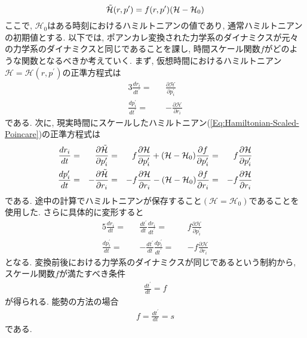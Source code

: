 \begin{equation}
  \Tilde{\mathcal{H}}(r, p^{\prime})
  =
  f(r, p^{\prime}) (\mathcal{H} - \mathcal{H}_{0})
  \label{Eq:Hamiltonian-Scaled-Poincare}
\end{equation}
ここで, $\mathcal{H}_{0}$はある時刻におけるハミルトニアンの値であり, 通常ハミルトニアンの初期値とする. 以下では, ポアンカレ変換された力学系のダイナミクスが元々の力学系のダイナミクスと同じであることを課し, 時間スケール関数$f$がどのような関数となるべきか考えていく. 
まず, 仮想時間におけるハミルトニアン$\mathcal{H} = \mathcal{H}(r, p^{\prime})$の正準方程式は
\begin{alignat}{3}
  \frac{d r_{i}}{dt^{\prime}}
  =&&
  \frac{\partial \mathcal{H}}{\partial p_{i}^{\prime}}
  \\
  \frac{d p_{i}^{\prime}}{dt^{\prime}}
  =&&-
  \frac{\partial \mathcal{H}}{\partial r_{i}}
\end{alignat}
である.
次に, 現実時間にスケールしたハミルトニアン(\ref{Eq:Hamiltonian-Scaled-Poincare})の正準方程式は
\begin{alignat}{5}
  \frac{d r_{i}}{d t}
  =&&
  \frac{\partial \Tilde{\mathcal{H}}}{\partial p_{i}^{\prime}}
  =&&
  f \frac{\partial \mathcal{H}}{\partial p_{i}^{\prime}}
  +
  (\mathcal{H} - \mathcal{H}_{0}) \frac{\partial f}{\partial p_{i}^{\prime}}
  =&&
  f \frac{\partial \mathcal{H}}{\partial p_{i}^{\prime}}
  \\
  \frac{d p_{i}^{\prime}}{d t}
  =&& -
  \frac{\partial \Tilde{\mathcal{H}}}{\partial r_{i}}
  =&& -
  f \frac{\partial \mathcal{H}}{\partial r_{i}}
  -
  (\mathcal{H} - \mathcal{H}_{0}) \frac{\partial f}{\partial r_{i}}
  =&& -
  f \frac{\partial \mathcal{H}}{\partial r_{i}}
\end{alignat}
である. 途中の計算でハミルトニアンが保存すること$(\mathcal{H} = \mathcal{H}_{0})$であることを使用した. さらに具体的に変形すると
\begin{alignat}{5}
  \frac{d r_{i}}{d t}
  =&&
  \frac{dt^{\prime}}{dt}
  \frac{d r_{i}}{d t^{\prime}}
  =&&
  f \frac{\partial \mathcal{H}}{\partial p_{i}^{\prime}}
  \\
  \frac{d p_{i}^{\prime}}{d t}
  = && -
  \frac{dt^{\prime}}{dt}
  \frac{d p_{i}^{\prime}}{d t^{\prime}}
  = && -
  f \frac{\partial \mathcal{H}}{\partial r_{i}}
\end{alignat}
となる.
変換前後における力学系のダイナミクスが同じであるという制約から, 
スケール関数$f$が満たすべき条件
\begin{align}
  \frac{dt^{\prime}}{dt} = f
\end{align}
が得られる. 能勢の方法の場合
\begin{align}
  f = \frac{dt^{\prime}}{dt} = s
\end{align}
である.

